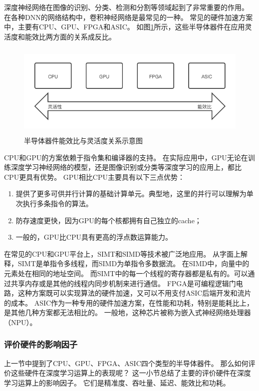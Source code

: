 深度神经网络在图像的识别、分类、检测和分割等领域起到了非常重要的作用。
在各种DNN的网络结构中，卷积神经网络是最常见的一种。
常见的硬件加速方案中，主要有CPU、GPU、FPGA和ASIC。
如图\ref{fig:silicon_alternatives}所示，这些半导体器件在应用灵活度和能效比两方面的关系成反比。  
\begin{figure}[htbp]
    \centering
    \includegraphics[width=15cm,height=4.5cm]{figures/silicon_alternatives.png}
    \caption{半导体器件能效比与灵活度关系示意图}
    \label{fig:silicon_alternatives}
\end{figure}

CPU和GPU的方案依赖于指令集和编译器的支持。
在实际应用中，GPU无论在训练深度学习神经网络的模型，还是图像识别或分类等深度学习的应用上，都比CPU更具有优势。
GPU相比CPU主要具有以下三点优势：
\begin{enumerate}
    \item 提供了更多可供并行计算的基础计算单元。典型地，这里的并行可以理解为单次执行多条指令的算法。
    \item 防存速度更快，因为GPU的每个核都拥有自己独立的cache；
    \item 一般的，GPU比CPU具有更高的浮点数运算能力。
\end{enumerate}
在常见的CPU和GPU平台上，SIMT和SIMD等技术被广泛地应用。
从字面上解释，SIMT是单指令多线程，而SIMD为单指令多数据流。
在SIMD中，向量中的元素处在相同的地址空间。
而SIMT中的每一个线程的寄存器都是私有的。可以通过共享内存或是其他的线程内同步机制来进行通信。
FPGA是可编程逻辑门电路，这种方案既可以实现算法的硬件加速，又可以不用支付ASIC后端开发和流片的成本。
ASIC作为一种专用的硬件加速方案，在性能和功耗，特别是能耗比上，是其他几种方案都无法相比的。
一般地，这种芯片被称为嵌入式神经网络处理器（NPU）。


\subsubsection{评价硬件的影响因子}
上一节中提到了CPU、GPU、FPGA、ASIC四个类型的半导体器件。
那么如何评价这些硬件在深度学习运算上的表现呢？
这一小节总结了主要的评价硬件在深度学习运算上的影响因子。
它们是精准度、吞吐量、延迟、能效比和功耗。

